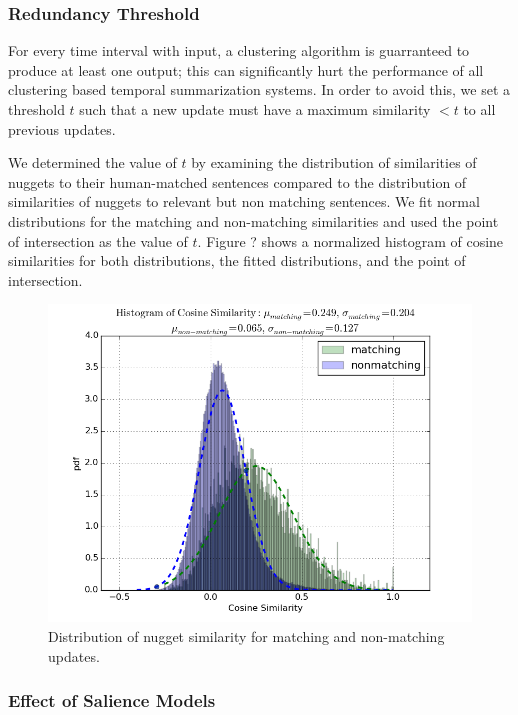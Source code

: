 \subsubsection{Redundancy Threshold}

For every time interval with input, a clustering algorithm is
guarranteed to produce at least one output; 
this can significantly hurt the performance of all clustering based 
temporal summarization systems. In order to avoid this, we set a threshold $t$
such that a new update must have a maximum similarity $< t$ to all previous 
updates.

We determined the value of $t$ by examining the distribution of similarities
of nuggets to their human-matched sentences compared to the distribution
of similarities of nuggets to relevant but non matching sentences. We fit
normal distributions for the matching and non-matching similarities and
used the point of intersection as the value of $t$.
Figure ? shows a normalized histogram of cosine similarities for both 
distributions, the fitted distributions, and the point of intersection.

\begin{figure}
\includegraphics[scale=.40]{match-dist.png} 
\caption{Distribution of nugget similarity for matching and non-matching 
updates.}
\end{figure}
\subsubsection{Effect of Salience Models}

